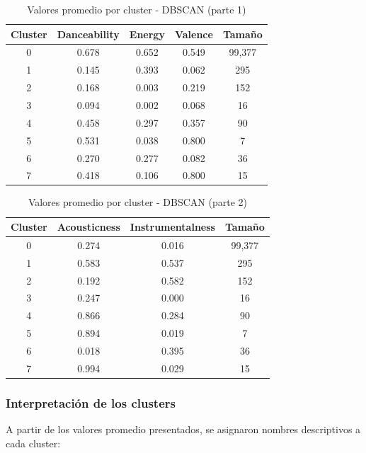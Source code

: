 \begin{table}[htbp]
\caption{Valores promedio por cluster - DBSCAN (parte 1)}
\centering
\small
\begin{tabular}{|c|c|c|c|c|}
\hline
\textbf{Cluster} & \textbf{Danceability} & \textbf{Energy} & \textbf{Valence} & \textbf{Tamaño} \\
\hline
0 & 0.678 & 0.652 & 0.549 & 99,377 \\
1 & 0.145 & 0.393 & 0.062 & 295 \\
2 & 0.168 & 0.003 & 0.219 & 152 \\
3 & 0.094 & 0.002 & 0.068 & 16 \\
4 & 0.458 & 0.297 & 0.357 & 90 \\
5 & 0.531 & 0.038 & 0.800 & 7 \\
6 & 0.270 & 0.277 & 0.082 & 36 \\
7 & 0.418 & 0.106 & 0.800 & 15 \\
\hline
\end{tabular}
\label{tab:clusters_dbscan_1}
\end{table}

\begin{table}[htbp]
\caption{Valores promedio por cluster - DBSCAN (parte 2)}
\centering
\small
\begin{tabular}{|c|c|c|c|}
\hline
\textbf{Cluster} & \textbf{Acousticness} & \textbf{Instrumentalness} & \textbf{Tamaño} \\
\hline
0 & 0.274 & 0.016 & 99,377 \\
1 & 0.583 & 0.537 & 295 \\
2 & 0.192 & 0.582 & 152 \\
3 & 0.247 & 0.000 & 16 \\
4 & 0.866 & 0.284 & 90 \\
5 & 0.894 & 0.019 & 7 \\
6 & 0.018 & 0.395 & 36 \\
7 & 0.994 & 0.029 & 15 \\
\hline
\end{tabular}
\label{tab:clusters_dbscan_2}
\end{table}

\subsubsection{Interpretación de los clusters}

A partir de los valores promedio presentados, se asignaron nombres descriptivos a cada cluster:

